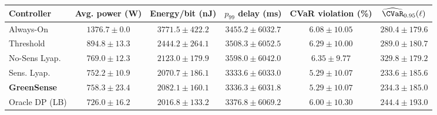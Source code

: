 \begin{tabular}{lccccc}
\toprule
Controller & Avg. power (W) & Energy/bit (nJ) & $p_{99}$ delay (ms) & CVaR violation (\%) & $\widehat{\CVaR}_{0.95}(\ell)$ \\
\midrule
Always-On & $1376.7\!\pm\!0.0$ & $3771.5\!\pm\!422.2$ & $3455.2\!\pm\!6032.7$ & $6.08\!\pm\!10.05$ & $280.4\!\pm\!179.6$ \\
Threshold & $894.8\!\pm\!13.3$ & $2444.2\!\pm\!264.1$ & $3508.3\!\pm\!6052.5$ & $6.29\!\pm\!10.00$ & $289.0\!\pm\!180.7$ \\
No-Sens Lyap. & $769.0\!\pm\!12.3$ & $2123.0\!\pm\!179.9$ & $3598.0\!\pm\!6042.0$ & $6.35\!\pm\!9.77$ & $329.8\!\pm\!179.2$ \\
Sens. Lyap. & $752.2\!\pm\!10.9$ & $2070.7\!\pm\!186.1$ & $3333.6\!\pm\!6033.0$ & $5.29\!\pm\!10.07$ & $233.6\!\pm\!185.6$ \\
\textbf{GreenSense} & $\mathbf{758.3\!\pm\!23.4}$ & $\mathbf{2082.1\!\pm\!160.1}$ & $\mathbf{3336.3\!\pm\!6031.8}$ & $\mathbf{5.29\!\pm\!10.07}$ & $\mathbf{234.3\!\pm\!185.0}$ \\
Oracle DP (LB) & $726.0\!\pm\!16.2$ & $2016.8\!\pm\!133.2$ & $3376.8\!\pm\!6069.2$ & $6.00\!\pm\!10.30$ & $244.4\!\pm\!193.0$ \\
\bottomrule
\end{tabular}
